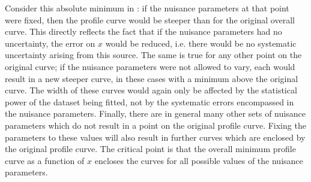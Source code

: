 Consider this absolute minimum in \nll: if the nuisance parameters at that
point were fixed, then the \nll profile curve would be steeper than for
the original overall \nll curve. This directly reflects the fact that
if the nuisance parameters had no uncertainty,
the error on $x$ would be reduced, i.e. there would be no systematic 
uncertainty arising from this source.
The same is true for any other point on the original curve; if the nuisance
parameters were not allowed to vary, each would result in a new steeper curve,
in these cases with a minimum above the original curve.
The width of these curves would again only be affected by the statistical
power of the dataset being fitted, not by the systematic errors encompassed
in the nuisance parameters.
Finally, there are in general
many other sets of nuisance parameters which do not result in a point on the
original profile curve. Fixing the parameters to these values will also result
in further curves which are enclosed by the original profile curve.
The critical point is that the overall \nll minimum profile curve as a function
of $x$ encloses the curves for all possible values of the nuisance
parameters.

